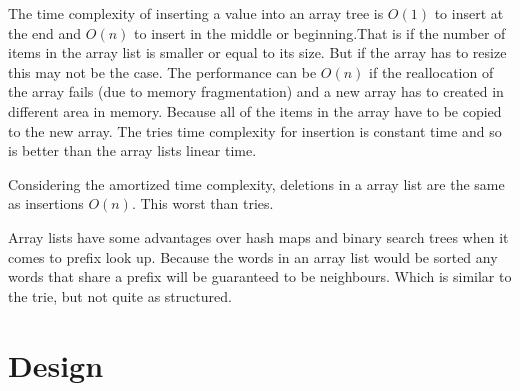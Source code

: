 \documentclass[10pt]{article} %
\begin{document}
			    The time complexity of inserting a value into an array tree is \begin{math}O(1)\end{math} to insert at the end and \begin{math}O(n)\end{math} to insert in the middle or beginning.That is if the number of items in the array list is smaller or equal to its size. 
			    But if the array has to resize this may not be the case. The performance can be \begin{math}O(n)\end{math} if the reallocation of the array fails (due to memory fragmentation) and a new array has to created in different area in memory. Because all of the items in the array have to be copied to the new array. 
			    The tries time complexity for insertion is constant time and so is better than the array lists linear time.
			
			    Considering the amortized time complexity, deletions in a array list are the same as insertions \begin{math}O(n)\end{math}. This worst than tries.
			    
			    Array lists have some advantages over hash maps and binary search trees when it comes to prefix look up. Because the words in an array list would be sorted any words that share a prefix will be guaranteed to be neighbours. Which is similar to the trie, but not quite as structured.
    \section{Design}
\end{document}
